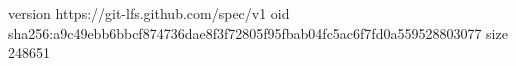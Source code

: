 version https://git-lfs.github.com/spec/v1
oid sha256:a9c49ebb6bbcf874736dae8f3f72805f95fbab04fc5ac6f7fd0a559528803077
size 248651
